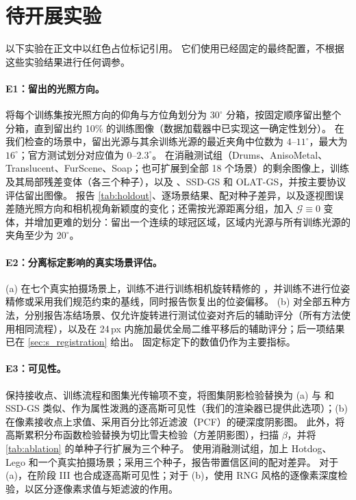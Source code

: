 \documentclass[10pt,twocolumn,letterpaper]{article}
\begin{document}
\section{待开展实验}
\label{sec:s_torun}
以下实验在正文中以红色占位标记引用。
它们使用已经固定的最终配置，不根据这些实验结果进行任何调参。

\paragraph{E1：留出的光照方向。}
将每个训练集按光照方向的仰角与方位角划分为 $30^\circ$ 分箱，按固定顺序留出整个分箱，直到留出约 10\% 的训练图像（数据加载器中已实现这一确定性划分）。
在我们检查的场景中，留出光源与其余训练光源的最近夹角中位数为 $4$--$11^\circ$，最大为 $16^\circ$；官方测试划分对应值为 $0$--$2.3^\circ$。
在消融测试组（Drums、AnisoMetal、Translucent、FurScene、Soap；也可扩展到全部 18 个场景）的剩余图像上，训练 \ours 及其局部残差变体（各三个种子），以及 \gsthree、SSD-GS 和 OLAT-GS，并按主要协议评估留出图像。
报告 \cref{tab:holdout}、逐场景结果、配对种子差异，以及逐视图误差随光照方向和相机视角新颖度的变化；还需按光源距离分组，加入 $\mathcal G\equiv0$ 变体，并增加更难的划分：留出一个连续的球冠区域，区域内光源与所有训练光源的夹角至少为 $20^\circ$。

\paragraph{E2：分离标定影响的真实场景评估。}
(a) 在七个真实拍摄场景上，训练不进行训练相机旋转精修的 \ours，并训练不进行位姿精修或采用我们规范约束的基线，同时报告恢复出的位姿偏移。
(b) 对全部五种方法，分别报告冻结场景、仅允许旋转进行测试位姿对齐后的辅助评分（所有方法使用相同流程），以及在 24\,px 内施加最优全局二维平移后的辅助评分；后一项结果已在 \cref{sec:s_registration} 给出。
固定标定下的数值仍作为主要指标。

\paragraph{E3：可见性。}
保持接收点、训练流程和图集光传输项不变，将图集阴影检验替换为 (a) 与 \gsthree 和 SSD-GS 类似、作为属性泼溅的逐高斯可见性（我们的渲染器已提供此选项）；(b) 在像素接收点上求值、采用百分比邻近滤波（PCF）的硬深度阴影图。
此外，将高斯累积分布函数检验替换为切比雪夫检验（方差阴影图），扫描 $\beta$，并将 \cref{tab:ablation} 的单种子行扩展为三个种子。
使用消融测试组，加上 Hotdog、Lego 和一个真实拍摄场景；采用三个种子，报告带置信区间的配对差异。
对于 (a)，在阶段 III 也合成逐高斯可见性；对于 (b)，使用 RNG 风格的逐像素深度检验，以区分逐像素求值与矩滤波的作用。
\end{document}
